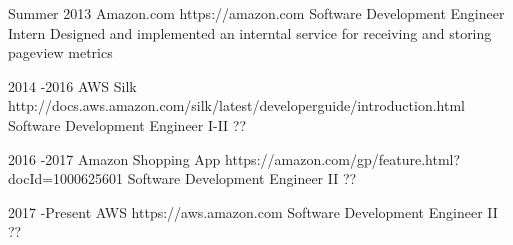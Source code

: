 \job
{Summer 2013}{}
{Amazon.com}
{https://amazon.com}
{Software Development Engineer Intern}
{Designed and implemented an interntal service for receiving and storing pageview metrics}

\job
{2014 -}{2016}
{AWS Silk}
{http://docs.aws.amazon.com/silk/latest/developerguide/introduction.html}
{Software Development Engineer I-II}
{??}

\job
{2016 -}{2017}
{Amazon Shopping App}
{https://amazon.com/gp/feature.html?docId=1000625601}
{Software Development Engineer II}
{??}

\job
{2017 -}{Present}
{AWS}
{https://aws.amazon.com}
{Software Development Engineer II}
{??}